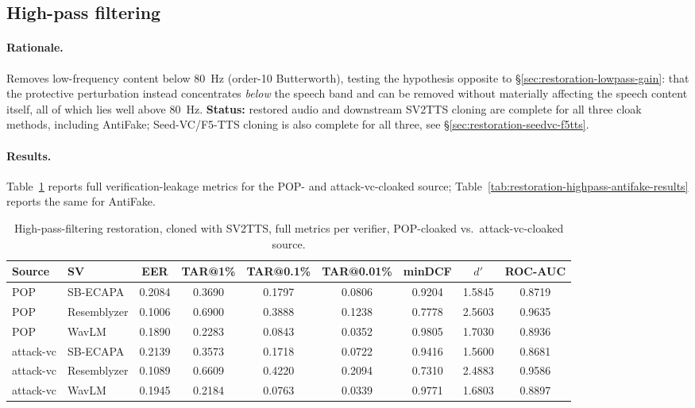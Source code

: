 \documentclass[11pt]{article}
\begin{document}
\subsection{High-pass filtering}
\label{sec:restoration-highpass}

\paragraph{Rationale.} Removes low-frequency content below 80~Hz
(order-10 Butterworth), testing the hypothesis opposite to
\S\ref{sec:restoration-lowpass-gain}: that the protective perturbation
instead concentrates \emph{below} the speech band and can be removed
without materially affecting the speech content itself, all of which
lies well above 80~Hz. \textbf{Status:} restored audio and downstream
SV2TTS cloning are complete for all three cloak methods, including
AntiFake; Seed-VC/F5-TTS cloning is also complete for all three, see
\S\ref{sec:restoration-seedvc-f5tts}.

\paragraph{Results.} Table~\ref{tab:restoration-highpass-results}
reports full verification-leakage metrics for the POP- and
attack-vc-cloaked source; Table~\ref{tab:restoration-highpass-antifake-results}
reports the same for AntiFake.

\begin{table}[H]
\centering
\caption{High-pass-filtering restoration, cloned with SV2TTS, full
metrics per verifier, POP-cloaked vs.\ attack-vc-cloaked source.}
\label{tab:restoration-highpass-results}
\begin{tabular}{llccccccc}
\toprule
Source & SV & EER & TAR@1\% & TAR@0.1\% & TAR@0.01\% & minDCF & $d'$ & ROC-AUC \\
\midrule
POP        & SB-ECAPA    & 0.2084 & 0.3690 & 0.1797 & 0.0806 & 0.9204 & 1.5845 & 0.8719 \\
POP        & Resemblyzer & 0.1006 & 0.6900 & 0.3888 & 0.1238 & 0.7778 & 2.5603 & 0.9635 \\
POP        & WavLM       & 0.1890 & 0.2283 & 0.0843 & 0.0352 & 0.9805 & 1.7030 & 0.8936 \\
\addlinespace
attack-vc  & SB-ECAPA    & 0.2139 & 0.3573 & 0.1718 & 0.0722 & 0.9416 & 1.5600 & 0.8681 \\
attack-vc  & Resemblyzer & 0.1089 & 0.6609 & 0.4220 & 0.2094 & 0.7310 & 2.4883 & 0.9586 \\
attack-vc  & WavLM       & 0.1945 & 0.2184 & 0.0763 & 0.0339 & 0.9771 & 1.6803 & 0.8897 \\
\bottomrule
\end{tabular}
\end{table}
\end{document}
